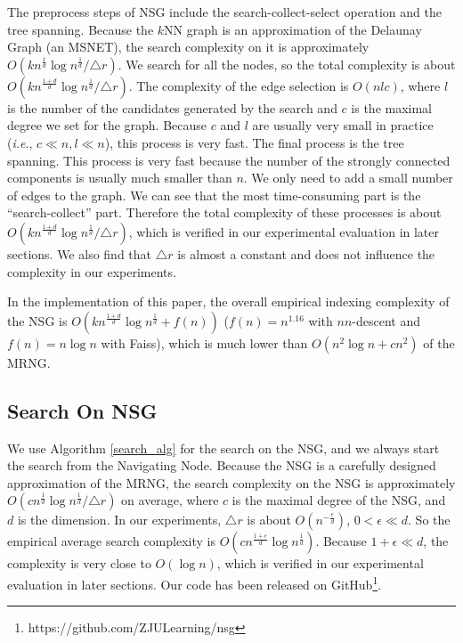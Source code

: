 \documentclass{vldb}
\def\ie {\emph{i.e}.} \def\Ie{\emph{I.e}.}
\begin{document}
The preprocess steps of NSG include the search-collect-select operation and the tree spanning. Because the $k$NN graph is an approximation of the Delaunay Graph (an MSNET), the search complexity on it is approximately $O(kn^{\frac{1}{d}}\log n^{\frac{1}{d}}/\triangle r)$. We search for all the nodes, so the total complexity is about $O(kn^{\frac{1+d}{d}}\log n^{\frac{1}{d}}/\triangle r)$. The complexity of the edge selection is $O(nlc)$, where $l$ is the number of the candidates generated by the search and $c$ is the maximal degree we set for the graph. Because $c$ and $l$ are usually very small in practice (\ie , $c\ll n, l\ll n$), this process is very fast. The final process is the tree spanning. This process is very fast because the number of the strongly connected components is usually much smaller than $n$. We only need to add a small number of edges to the graph. We can see that the most time-consuming part is the ``search-collect'' part. Therefore the total complexity of these processes is about $O(kn^{\frac{1+d}{d}}\log n^{\frac{1}{d}}/\triangle r)$, which is verified in our experimental evaluation in later sections. We also find that $\triangle r$ is almost a constant and does not influence the complexity in our experiments. 

In the implementation of this paper, the overall empirical indexing complexity of the NSG is $O(kn^{\frac{1+d}{d}}\log n^{\frac{1}{d}} + f(n))$ ($f(n) = n^{1.16}$ with $nn$-descent and $f(n)=n\log n$ with Faiss), which is much lower than $O(n^2\log n + cn^2)$ of the MRNG.


\subsection{Search On NSG}
We use Algorithm \ref{search_alg} for the search on the NSG, and we always start the search from the Navigating Node. Because the NSG is a carefully designed approximation of the MRNG, the search complexity on the NSG is approximately $O(cn^{\frac{1}{d}}\log n^{\frac{1}{d}}/\triangle r)$ on average, where $c$ is the maximal degree of the NSG, and $d$ is the dimension. In our experiments, $\triangle{r}$ is about $O(n^{-\frac{\epsilon}{d}})$, $0<\epsilon\ll d$. So the empirical average search complexity is $O(cn^{\frac{1+\epsilon}{d}}\log n^{\frac{1}{d}})$. Because $1+\epsilon \ll d$, the complexity is very close to $O(\log n)$, which is verified in our experimental evaluation in later sections. Our code has been released on GitHub\footnote{https://github.com/ZJULearning/nsg}.
\end{document}
